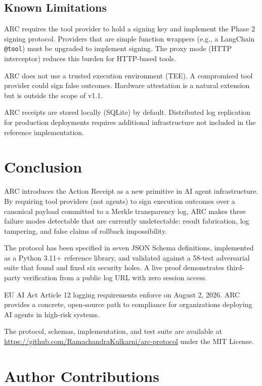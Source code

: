 \documentclass[10pt,twocolumn]{article}
\begin{document}
\subsection{Known Limitations}

ARC requires the tool provider to hold a signing key and implement the
Phase 2 signing protocol. Providers that are simple function wrappers
(e.g., a LangChain \texttt{@tool}) must be upgraded to implement signing.
The proxy mode (HTTP interceptor) reduces this burden for HTTP-based tools.

ARC does not use a trusted execution environment (TEE). A compromised tool
provider could sign false outcomes. Hardware attestation is a natural
extension but is outside the scope of v1.1.

ARC receipts are stored locally (SQLite) by default. Distributed log
replication for production deployments requires additional infrastructure
not included in the reference implementation.

\section{Conclusion}

ARC introduces the Action Receipt as a new primitive in AI agent infrastructure.
By requiring tool providers (not agents) to sign execution outcomes over a
canonical payload committed to a Merkle transparency log, ARC makes three
failure modes detectable that are currently undetectable: result fabrication,
log tampering, and false claims of rollback impossibility.

The protocol has been specified in seven JSON Schema definitions, implemented
as a Python 3.11+ reference library, and validated against a 58-test adversarial
suite that found and fixed six security holes. A live proof demonstrates
third-party verification from a public log URL with zero session access.

EU AI Act Article 12 logging requirements enforce on August 2, 2026. ARC
provides a concrete, open-source path to compliance for organizations deploying
AI agents in high-risk systems.

The protocol, schemas, implementation, and test suite are available at
\url{https://github.com/RamachandraKulkarni/arc-protocol} under the MIT License.

\section*{Author Contributions}
\end{document}
